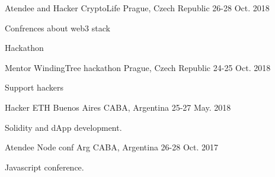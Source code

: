 \begin{cventries}
\cventry
{Atendee and Hacker} %
{CryptoLife} %
{Prague, Czech Republic} %
{26-28 Oct. 2018} %
{ %
\begin{cvitems}
\item {Confrences about web3 stack}
\item {Hackathon}
\end{cvitems}
}
\cventry
{Mentor} %
{WindingTree hackathon} %
{Prague, Czech Republic} %
{24-25 Oct. 2018} %
{ %
\begin{cvitems}
\item {Support hackers}
\end{cvitems}
}
\cventry
{Hacker} %
{ETH Buenos Aires} %
{CABA, Argentina} %
{25-27 May. 2018} %
{ %
\begin{cvitems}
\item {Solidity and dApp development.}
\end{cvitems}
}
\cventry
{Atendee} %
{Node conf Arg} %
{CABA, Argentina} %
{26-28 Oct. 2017} %
{ %
\begin{cvitems}
\item {Javascript conference.}
\end{cvitems}
}
\end{cventries}

